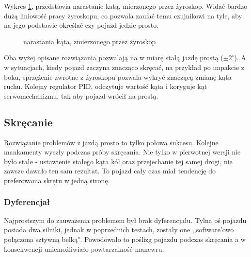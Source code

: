        Wykres \ref{plot:delta_angle_with_gyro}, przedstawia narastanie katą, mierzonego przez żyroskop.
        Widać bardzo dużą liniowość pracy żyroskopu, co pozwala zaufać temu czujnikowi na tyle, aby na jego podstawie określać czy pojazd jedzie prosto.

        \begin{figure}[!ht]
            \centering
                \renewcommand{\figurename}{Wykres}
                \caption{narastania kąta, zmierzonego przez żyroskop}
                \label{plot:delta_angle_with_gyro}
        \end{figure}


    Oba wyżej opisane rozwiązania pozwalają na w miarę stałą jazdę prostą ($\pm 2^\circ$).
    A w sytuacjach, kiedy pojazd zaczyna znacząco skręcać, na przykład po impakcie z boku, sprzężenie zwrotne z żyroskopu pozwala wykryć znaczącą zmianę kąta ruchu.
    Kolejny regulator PID, odczytuje wartość kąta i koryguje kąt serwomechanizmu, tak aby pojazd wrócił na prostą.

    \subsection{Skręcanie}
        Rozwiązanie problemów z jazdą prosto to tylko połowa sukcesu.
        Kolejne mankamenty wyszły podczas próby skręcania.
        Nie tylko w pierwotnej wersji nie było stałe - ustawienie stałego kąta kół oraz przejechanie tej samej drogi, nie zawsze dawało ten sam rezultat.
        To pojazd cały czas miał tendencję do preferowania skrętu w jedną stronę.

        \subsubsection{Dyferencjał}
        \label{subsubsec:dyferencjal}
        Najprostszym do zauważenia problemem był brak dyferencjału.
        Tylna oś pojazdu posiada dwa silniki, jednak w poprzednich testach, zostały one ,,software'owo połączona sztywną belką".
        Powodowało to poślizg pojazdu podczas skręcania a w konsekwencji uniemożliwiało powtarzalność manewru.

